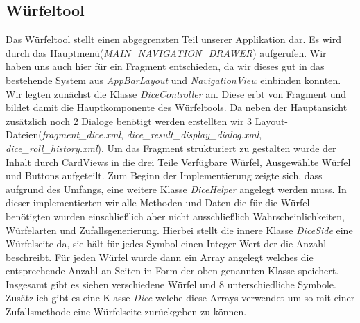 \subsection{Würfeltool}
Das Würfeltool stellt einen abgegrenzten Teil unserer Applikation dar. Es wird durch das Hauptmenü(\textit{MAIN\_NAVIGATION\_DRAWER}) aufgerufen. Wir haben uns auch hier für ein Fragment entschieden, da wir dieses gut in das bestehende System aus \textit{AppBarLayout} und \textit{NavigationView} einbinden konnten. Wir legten zunächst die Klasse \textit{DiceController} an. Diese erbt von Fragment und bildet damit die Hauptkomponente des Würfeltools. Da neben der Hauptansicht zusätzlich noch 2 Dialoge benötigt werden erstellten wir 3 Layout-Dateien(\textit{fragment\_dice.xml}, \textit{dice\_result\_display\_dialog.xml}, \textit{dice\_roll\_history.xml}). Um das Fragment strukturiert zu gestalten wurde der Inhalt durch CardViews in die drei Teile \grqq Verfügbare Würfel\grqq{}, \grqq Ausgewählte Würfel\grqq{} und \grqq Buttons\grqq{} aufgeteilt. Zum Beginn der Implementierung zeigte sich, dass aufgrund des Umfangs, eine weitere Klasse \textit{DiceHelper} angelegt werden muss. In dieser implementierten wir alle Methoden und Daten die für die Würfel benötigten wurden einschließlich aber nicht ausschließlich Wahrscheinlichkeiten, Würfelarten und Zufallsgenerierung. Hierbei stellt die innere Klasse \textit{DiceSide} eine Würfelseite da, sie hält für jedes Symbol einen Integer-Wert der die Anzahl beschreibt. Für jeden Würfel wurde dann ein Array angelegt welches die entsprechende Anzahl an Seiten in Form der oben genannten Klasse speichert. Insgesamt gibt es sieben verschiedene Würfel und 8 unterschiedliche Symbole. Zusätzlich gibt es eine Klasse \textit{Dice} welche diese Arrays verwendet um so mit einer Zufallsmethode eine Würfelseite zurückgeben zu können.\\
